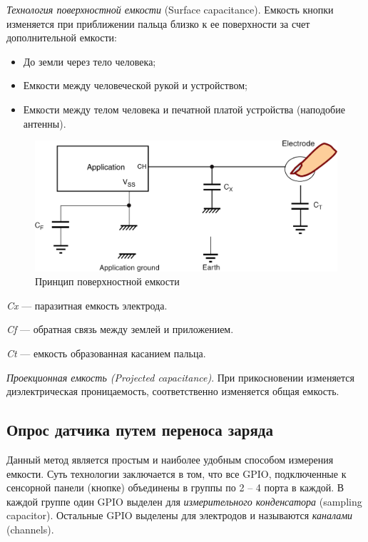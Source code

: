 	\textit{Технология поверхностной емкости }(Surface capacitance). Емкость кнопки изменяется при приближении пальца близко к ее поверхности за счет дополнительной емкости: 
\begin{itemize}
\item До земли через тело человека;
\item Емкости между человеческой рукой и устройством;
\item Емкости между телом человека и печатной платой устройства (наподобие антенны).
\end{itemize}
\begin{figure}[H]
\begin{center}
\includegraphics[scale=0.25]{Image/55.jpg} 
\end{center}
\caption{Принцип поверхностной емкости}
\end{figure}

\textit {Cx} --- паразитная емкость электрода.
 
\textit {Cf} --- обратная связь между землей и приложением.

\textit {Ct} --- емкость образованная касанием пальца.

\textit{Проекционная емкость (Projected capacitance)}. При прикосновении изменяется диэлектрическая проницаемость, соответственно изменяется общая емкость.

\subsection{Опрос датчика путем переноса заряда}

Данный метод является простым и наиболее удобным способом измерения емкости. Суть технологии заключается в том, что все GPIO, подключенные к сенсорной панели (кнопке) объединены в группы по 2 -- 4 порта в каждой. В каждой группе один GPIO выделен для \textit{измерительного конденсатора} (sampling capacitor). Остальные GPIO выделены для электродов и называются \textit{каналами} (channels).

